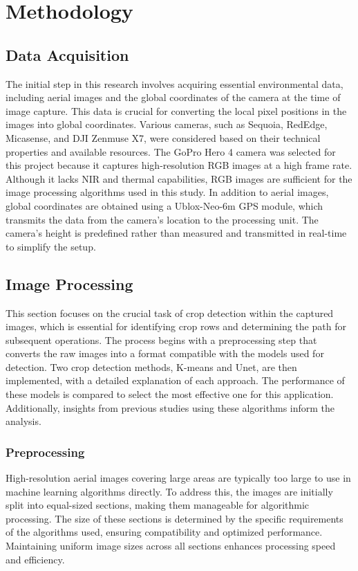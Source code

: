 \documentclass[conference]{IEEEtran}
\begin{document}
\section{Methodology}
\subsection{Data Acquisition}
The initial step in this research involves acquiring essential environmental data, including aerial images and the global coordinates of the camera at the time of image capture. This data is crucial for converting the local pixel positions in the images into global coordinates. Various cameras, such as Sequoia, RedEdge, Micasense, and DJI Zenmuse X7, were considered based on their technical properties and available resources. The GoPro Hero 4 camera was selected for this project because it captures high-resolution RGB images at a high frame rate. Although it lacks NIR and thermal capabilities, RGB images are sufficient for the image processing algorithms used in this study. In addition to aerial images, global coordinates are obtained using a Ublox-Neo-6m GPS module, which transmits the data from the camera’s location to the processing unit. The camera’s height is predefined rather than measured and transmitted in real-time to simplify the setup.

\subsection{Image Processing}
This section focuses on the crucial task of crop detection within the captured images, which is essential for identifying crop rows and determining the path for subsequent operations. The process begins with a preprocessing step that converts the raw images into a format compatible with the models used for detection. Two crop detection methods, K-means and Unet, are then implemented, with a detailed explanation of each approach. The performance of these models is compared to select the most effective one for this application. Additionally, insights from previous studies using these algorithms inform the analysis.

\subsubsection{Preprocessing}
High-resolution aerial images covering large areas are typically too large to use in machine learning algorithms directly. To address this, the images are initially split into equal-sized sections, making them manageable for algorithmic processing. The size of these sections is determined by the specific requirements of the algorithms used, ensuring compatibility and optimized performance. Maintaining uniform image sizes across all sections enhances processing speed and efficiency.
\end{document}
